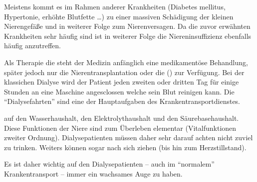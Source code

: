 
Meistens kommt es im Rahmen anderer Krankheiten
(Diabetes mellitus, Hypertonie, erhöhte Blutfette \ldots) zu einer massiven
Schädigung der kleinen Nierengefäße und in weiterer Folge zum Nierenversagen. Da
die zuvor erwähnten Krankheiten sehr häufig sind ist in weiterer Folge die
Niereninsuffizienz ebenfalls häufig anzutreffen. 

Als Therapie die steht der
Medizin anfänglich eine medikamentöse Behandlung, später jedoch nur die
Nierentransplantation oder die 
() zur Verfügung. Bei der klassichen Dialyse
wird der Patient jeden zweiten oder dritten Tag für
einige Stunden an eine Maschine angesclossen welche sein
Blut reinigen kann. Die "`Dialysefahrten"' sind eine der
Hauptaufgaben des Krankentransportdienstes.

 auf den Wasserhaushalt, den
Elektrolythaushalt und den Säurebasehaushalt. Diese Funktionen der Niere sind zum Überleben elementar (Vitalfunktionen zweiter
Ordnung). Dialysepatienten müssen daher sehr darauf achten nicht zuviel zu
trinken. Weiters können  sogar
 nach sich ziehen (bis hin
zum Herzstillstand).

Es ist daher wichtig auf den
Dialysepatienten -- auch im "`normalem"' Krankentransport --
immer ein wachsames Auge zu haben.







% 
% 
% 
% 
% 
% 
% 
% 




